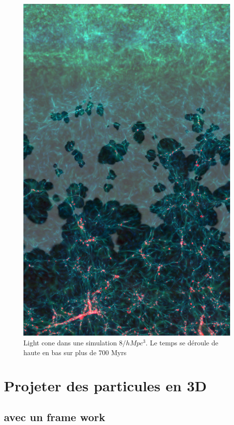 \begin{figure}[bth]
        \includegraphics[height=.95\textheight]{img/04/frise_wall.png} 
        \caption{Light cone dans une simulation $8/h Mpc ^3$. Le temps se déroule de haute en bas sur plus de 700 Myrs }
 		\label{fig:lightcone}
\end{figure}

\section{Projeter des particules en 3D}

\subsection{avec un frame work} 

